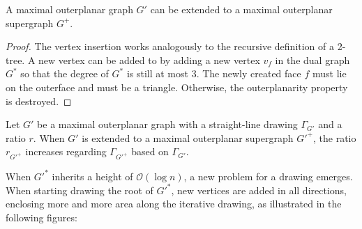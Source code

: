 \begin{lemma}
	A maximal outerplanar graph $G'$ can be extended to a maximal outerplanar supergraph $G^+$.\label{l:outerplanar-supergraph}
\end{lemma}
\begin{proof}
	The vertex insertion works analogously to the recursive definition of a 2-tree. A new vertex can be added to  by adding a new vertex $v_f$ in the dual graph $G^*$ so that the degree of $G^*$ is still at most 3. The newly created face $f$ must lie on the outerface and must be a triangle. Otherwise, the outerplanarity property is destroyed. 
\end{proof}

\begin{observation}
	Let $G'$ be a maximal outerplanar graph with a straight-line drawing $\Gamma_{G'}$ and a ratio $r$. When $G'$ is extended to a maximal outerplanar supergraph $G'^+$, the ratio $r_{G'^+}$ increases regarding $\Gamma_{G'^+}$ based on $\Gamma_{G'}$.\label{ob:area_leads_to_ratio_increase}
\end{observation}
When $G'^*$ inherits a height of $\mathcal{O}(\log n)$, a new problem for a drawing emerges. When starting drawing the root of $G'^*$, new vertices are added in all directions, enclosing more and more area along the iterative drawing, as illustrated in the following figures:
